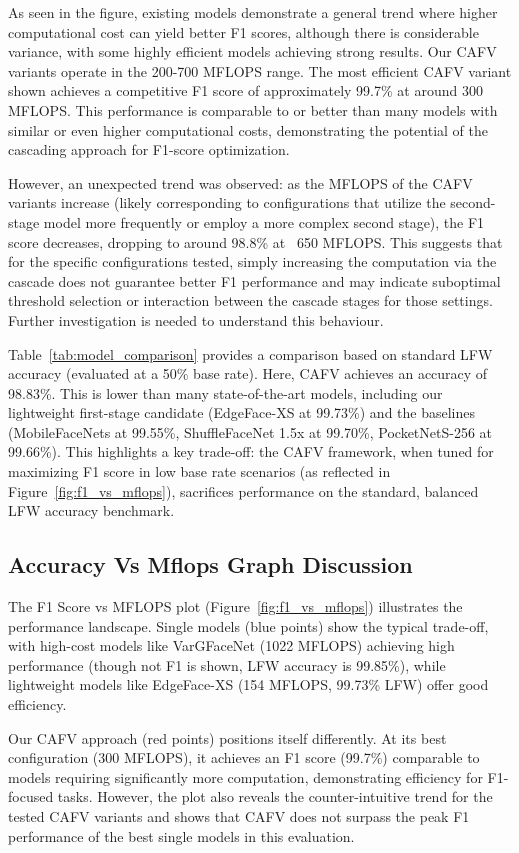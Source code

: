 \documentclass[times,10pt,twocolumn]{article}
\begin{document}
As seen in the figure, existing models demonstrate a general trend where higher computational cost can yield better F1 scores, although there is considerable variance, with some highly efficient models achieving strong results. Our CAFV variants operate in the 200-700 MFLOPS range. The most efficient CAFV variant shown achieves a competitive F1 score of approximately 99.7\% at around 300 MFLOPS. This performance is comparable to or better than many models with similar or even higher computational costs, demonstrating the potential of the cascading approach for F1-score optimization.

However, an unexpected trend was observed: as the MFLOPS of the CAFV variants increase (likely corresponding to configurations that utilize the second-stage model more frequently or employ a more complex second stage), the F1 score decreases, dropping to around 98.8\% at ~650 MFLOPS. This suggests that for the specific configurations tested, simply increasing the computation via the cascade does not guarantee better F1 performance and may indicate suboptimal threshold selection or interaction between the cascade stages for those settings. Further investigation is needed to understand this behaviour.

Table~\ref{tab:model_comparison} provides a comparison based on standard LFW accuracy (evaluated at a 50\% base rate). Here, CAFV achieves an accuracy of 98.83\%. This is lower than many state-of-the-art models, including our lightweight first-stage candidate (EdgeFace-XS at 99.73\%) and the baselines (MobileFaceNets at 99.55\%, ShuffleFaceNet 1.5x at 99.70\%, PocketNetS-256 at 99.66\%). This highlights a key trade-off: the CAFV framework, when tuned for maximizing F1 score in low base rate scenarios (as reflected in Figure~\ref{fig:f1_vs_mflops}), sacrifices performance on the standard, balanced LFW accuracy benchmark.

\subsection{Accuracy Vs Mflops Graph Discussion}
The F1 Score vs MFLOPS plot (Figure~\ref{fig:f1_vs_mflops}) illustrates the performance landscape. Single models (blue points) show the typical trade-off, with high-cost models like VarGFaceNet (1022 MFLOPS) achieving high performance (though not F1 is shown, LFW accuracy is 99.85\%), while lightweight models like EdgeFace-XS (154 MFLOPS, 99.73\% LFW) offer good efficiency. 

Our CAFV approach (red points) positions itself differently. At its best configuration (300 MFLOPS), it achieves an F1 score (99.7\%) comparable to models requiring significantly more computation, demonstrating efficiency for F1-focused tasks. However, the plot also reveals the counter-intuitive trend for the tested CAFV variants and shows that CAFV does not surpass the peak F1 performance of the best single models in this evaluation.
\end{document}

